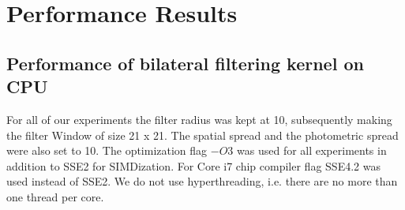 \documentclass{IEEEtran}
\begin{document}
\section{Performance Results}
\label{sec:results}
\subsection{Performance of bilateral filtering kernel on CPU}
For all of our experiments the filter radius was kept at 10, subsequently making the filter Window of size 21 x 21. The spatial spread and the photometric spread were also set to 10. The optimization flag $-O3$ was used for all experiments in addition to SSE2 for SIMDization. For Core i7 chip compiler flag SSE4.2 was used instead of SSE2. We do not use hyperthreading, i.e. there are no more than one thread per core. 
\end{document}
